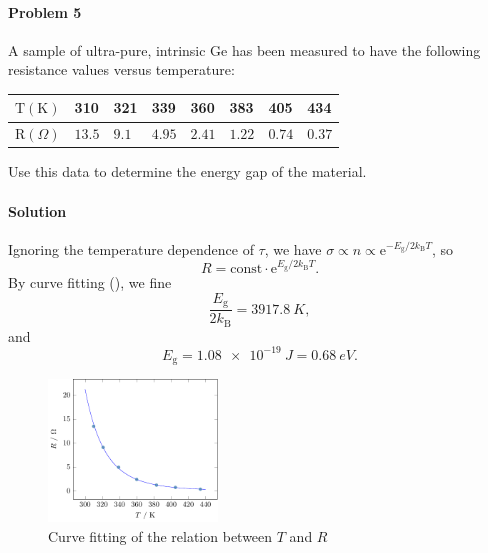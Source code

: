 \documentclass[hyperref, a4paper]{article}
\newcommand*{\ee}{\mathrm{e}}
\newcommand*{\const}{\mathrm{const}}
\begin{document}
\paragraph{Problem 5} A sample of ultra-pure, intrinsic Ge has been measured to have the following resistance values versus temperature:
\begin{center}
    \begin{tabular}{|l|l|l|l|l|l|l|l|}
        \hline $\mathrm{T}(\mathrm{K})$ & 310 & 321 & 339 & 360 & 383 & 405 & 434 \\
        \hline $\mathrm{R}(\Omega)$ & $13.5$ & $9.1$ & $4.95$ & $2.41$ & $1.22$ & $0.74$ & $0.37$ \\
        \hline
        \end{tabular}
\end{center}
Use this data to determine the energy gap of the material.

\paragraph{Solution} Ignoring the temperature dependence of $\tau$,
we have $\sigma \propto n \propto \ee^{- E_\text{g} / 2 k_{\text{B}} T}$,
so 
\begin{equation}
    R = \const \cdot \ee^{E_{\text{g}} / 2 k_{\text{B}} T}.
\end{equation}
By curve fitting (), we fine 
\[
    \frac{E_{\text{g}}}{2 k_{\text{B}}} = \SI{3917.8}{K},
\]
and 
\begin{equation}
    E_{\text{g}} = \SI{1.08e-19}{J} = \SI{0.68}{eV}.
\end{equation}

\begin{figure}
    \centering
    \includegraphics[width=0.4\textwidth]{plots/resistance-fitting-1.pdf}
    \caption{Curve fitting of the relation between $T$ and $R$}
    \label{fig:curve-fitting}
\end{figure}
\end{document}
